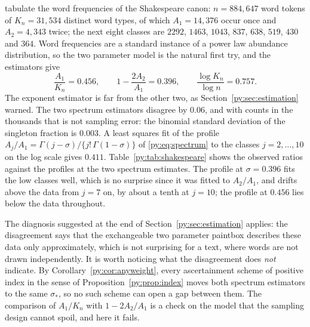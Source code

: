 \begin{example}
\label{py:ex:shakespeare}
\citet{py:efron1976} tabulate the word frequencies of the Shakespeare canon: $n = 884{,}647$ word
tokens of $K_n = 31{,}534$ distinct word types, of which $A_1 = 14{,}376$ occur once and
$A_2 = 4{,}343$ twice; the next eight classes are $2292$, $1463$, $1043$, $837$, $638$, $519$,
$430$ and $364$. Word frequencies are a standard instance of a power law abundance distribution, so
the two parameter model is the natural first try, and the estimators give
\[
\frac{A_1}{K_n} = 0.456, \qquad 1-\frac{2A_2}{A_1} = 0.396, \qquad
\frac{\log K_n}{\log n} = 0.757 .
\]
The exponent estimator is far from the other two, as Section~\ref{py:sec:estimation} warned. The two
spectrum estimators disagree by $0.06$, and with counts in the thousands that is not sampling error:
the binomial standard deviation of the singleton fraction is $0.003$. A least squares fit of the
profile $A_j/A_1 = \Gamma(j-\sigma)/\{j!\,\Gamma(1-\sigma)\}$ of \eqref{py:eq:spectrum} to the classes
$j = 2, \dots, 10$ on the log scale gives $0.411$. Table~\ref{py:tab:shakespeare} shows the
observed ratios against the profiles at the two spectrum estimates. The profile at $\sigma = 0.396$
fits the low classes well, which is no surprise since it was fitted to $A_2/A_1$, and drifts above
the data from $j = 7$ on, by about a tenth at $j = 10$; the profile at $0.456$ lies below the data throughout.

The diagnosis suggested at the end of Section~\ref{py:sec:estimation} applies: the disagreement
says that the exchangeable two parameter paintbox describes these data only approximately, which is
not surprising for a text, where words are not drawn independently. It is worth noticing what the
disagreement does \emph{not} indicate. By Corollary~\ref{py:cor:anyweight}, every ascertainment
scheme of positive index in the sense of Proposition~\ref{py:prop:index} moves both spectrum estimators to the same $\sigma_*$, so no
such scheme can open a gap between them. The comparison of $A_1/K_n$ with $1-2A_2/A_1$ is a check on
the model that the sampling design cannot spoil, and here it fails.
\end{example}

